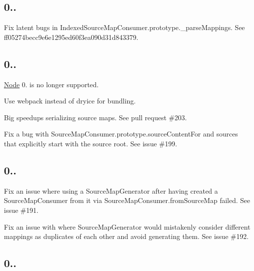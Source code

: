 \subsection*{0..}


\begin{DoxyItemize}
\item Fix latent bugs in Indexed\+Source\+Map\+Consumer.\+prototype.\+\_\+parse\+Mappings. See ff05274becc9e6e1295ed60f3ea090d31d843379.
\end{DoxyItemize}

\subsection*{0..}


\begin{DoxyItemize}
\item \mbox{\hyperlink{classNode}{Node}} 0. is no longer supported.
\item Use webpack instead of dryice for bundling.
\item Big speedups serializing source maps. See pull request \#203.
\item Fix a bug with {\ttfamily Source\+Map\+Consumer.\+prototype.\+source\+Content\+For} and sources that explicitly start with the source root. See issue \#199.
\end{DoxyItemize}

\subsection*{0..}


\begin{DoxyItemize}
\item Fix an issue where using a {\ttfamily Source\+Map\+Generator} after having created a {\ttfamily Source\+Map\+Consumer} from it via {\ttfamily Source\+Map\+Consumer.\+from\+Source\+Map} failed. See issue \#191.
\item Fix an issue with where {\ttfamily Source\+Map\+Generator} would mistakenly consider different mappings as duplicates of each other and avoid generating them. See issue \#192.
\end{DoxyItemize}

\subsection*{0..}


